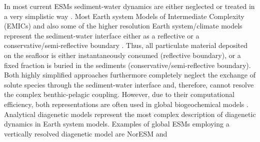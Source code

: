 \documentclass[gmd, manuscript]{copernicus}
\begin{document}
In most current ESMs sediment-water dynamics are either neglected or treated in a very simplistic way \citep{soetaert_coupling_2000, hulse_understanding_2017}. 
Most Earth system Models of Intermediate Complexity (EMICs) and also some of the higher resolution Earth system/climate models represent the sediment-water interface either as a 
reflective or a conservative/semi-reflective boundary \citep{hulse_understanding_2017}. 
Thus, all particulate material deposited on the seafloor is either instantaneously consumed (reflective boundary), or a fixed fraction is buried in the sediments (conservative/semi-reflective boundary). 
Both highly simplified approaches furthermore completely neglect the exchange of solute species through the sediment-water interface and, therefore, cannot resolve the complex benthic-pelagic coupling. 
However, due to their computational efficiency, both representations are often used in global biogeochemical models \citep[e.g.][]{najjar_impact_2007, ridgwell_marine_2007, goosse_description_2010}. 
Analytical diagenetic models represent the most complex description of diagenetic dynamics in Earth system models. Examples of global ESMs employing a vertically resolved diagenetic model are NorESM \citep{tjiputra_evaluation_2013} and 
\end{document}
